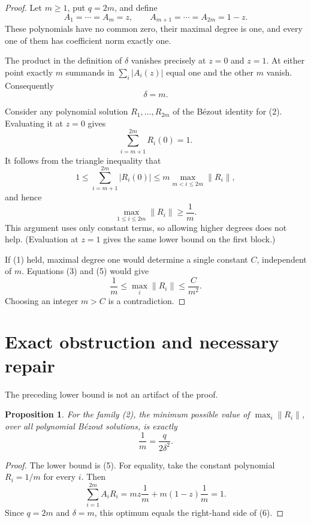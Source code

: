\documentclass[11pt]{article}
\newtheorem{proposition}[theorem]{Proposition}
\begin{document}
\begin{proof}
Let \(m\ge1\), put \(q=2m\), and define
\[
 A_1=\cdots=A_m=z,
 \qquad
 A_{m+1}=\cdots=A_{2m}=1-z.                              \tag{2}
\]
These polynomials have no common zero, their maximal degree is one, and every
one of them has coefficient norm exactly one.

The product in the definition of \(\delta\) vanishes precisely at \(z=0\)
and \(z=1\).  At either point exactly \(m\) summands in
\(\sum_i|A_i(z)|\) equal one and the other \(m\) vanish.  Consequently
\[
 \delta=m.                                                \tag{3}
\]

Consider any polynomial solution \(R_1,\ldots,R_{2m}\) of the B\'ezout
identity for (2).  Evaluating it at \(z=0\) gives
\[
 \sum_{i=m+1}^{2m}R_i(0)=1.                              \tag{4}
\]
It follows from the triangle inequality that
\[
 1\le \sum_{i=m+1}^{2m}|R_i(0)|
   \le m\max_{m<i\le2m}\|R_i\|,
\]
and hence
\[
 \max_{1\le i\le2m}\|R_i\|\ge \frac1m.                \tag{5}
\]
This argument uses only constant terms, so allowing higher degrees does not
help.  (Evaluation at \(z=1\) gives the same lower bound on the first block.)

If (1) held, maximal degree one would determine a single constant \(C\),
independent of \(m\).  Equations (3) and (5) would give
\[
 \frac1m\le \max_i\|R_i\|\le\frac{C}{m^2}.
\]
Choosing an integer \(m>C\) is a contradiction.
\end{proof}

\section{Exact obstruction and necessary repair}

The preceding lower bound is not an artifact of the proof.

\begin{proposition}
For the family \emph{(2)}, the minimum possible value of
\(\max_i\|R_i\|\), over all polynomial B\'ezout solutions, is exactly
\[
 \frac1m=\frac{q}{2\delta^2}.                            \tag{6}
\]
\end{proposition}

\begin{proof}
The lower bound is (5).  For equality, take the constant polynomial
\(R_i=1/m\) for every \(i\).  Then
\[
 \sum_{i=1}^{2m}A_iR_i
 =m z\frac1m+m(1-z)\frac1m=1.
\]
Since \(q=2m\) and \(\delta=m\), this optimum equals the right-hand side
of (6).
\end{proof}
\end{document}
